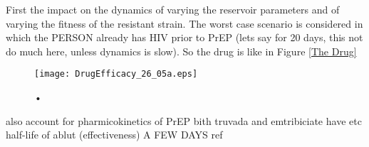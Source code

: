 \documentclass[DIV=15]{scrartcl}
\begin{document}
First the impact on the dynamics of varying the reservoir parameters and of varying the  fitness of the resistant strain. The worst case scenario is considered in which the PERSON already has HIV prior to PrEP (lets say for 20 days, this not do much here, unless dynamics is slow). So the drug is like in Figure \ref{The Drug}















\iffalse
 viral load high during acute phase not much evidence of transmission 


To model the {\ae}ffect of Pre-Exposure Prophylaxis (PrEP) it is further assumed that the replication rate $\gamma$ depends on the amount of antiviral drug present in the host.

\fi




\begin{figure}[h]
 \begin{center}
 \texttt{[image: DrugEfficacy\_26\_05a.eps]}
 \end{center}
 \caption{•}
 \label{Drug efficacy}
 \end{figure}
 
also account for pharmicokinetics of PrEP bith truvada and emtribiciate have etc half-life of ablut (effectiveness) A  FEW DAYS ref
\end{document}
